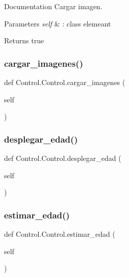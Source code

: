 Documentation Cargar imagen. 


\begin{DoxyParams}{Parameters}
{\em self} & \+: class elemeant \\
\hline
\end{DoxyParams}
\begin{DoxyReturn}{Returns}
true 
\end{DoxyReturn}
\mbox{\label{class_control_1_1_control_a75e5202cfb3776a4d9d88ff00db4518a}} 
\subsubsection{\texorpdfstring{cargar\+\_\+imagenes()}{cargar\_imagenes()}}
{\footnotesize\ttfamily def Control.\+Control.\+cargar\+\_\+imagenes (\begin{DoxyParamCaption}\item[{}]{self }\end{DoxyParamCaption})}

\mbox{\label{class_control_1_1_control_a5c05a607e82b93298524f090feaa2397}} 
\subsubsection{\texorpdfstring{desplegar\+\_\+edad()}{desplegar\_edad()}}
{\footnotesize\ttfamily def Control.\+Control.\+desplegar\+\_\+edad (\begin{DoxyParamCaption}\item[{}]{self }\end{DoxyParamCaption})}

\mbox{\label{class_control_1_1_control_a214b0abae8fa56b8a6e4dae3cd053e7d}} 
\subsubsection{\texorpdfstring{estimar\+\_\+edad()}{estimar\_edad()}}
{\footnotesize\ttfamily def Control.\+Control.\+estimar\+\_\+edad (\begin{DoxyParamCaption}\item[{}]{self }\end{DoxyParamCaption})}


